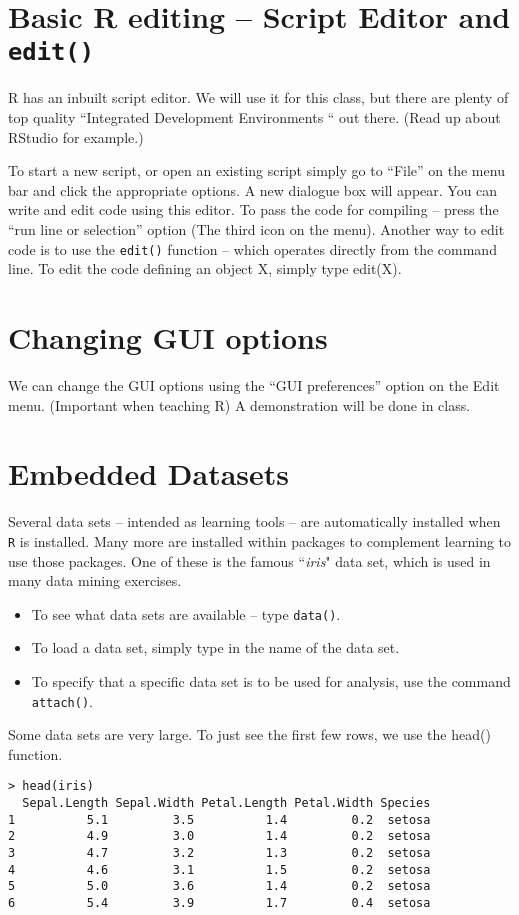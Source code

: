 

\section{Basic R editing – Script Editor and \texttt{edit()}}
R has an inbuilt script editor. We will use it for this class, but there are plenty of top quality “Integrated Development Environments “ out there. (Read up about RStudio for  example.)

To start a new script, or open an existing script simply go to “File” on the menu bar and click the appropriate options.
A new dialogue box will appear. You can write and edit code using this editor.
To pass the code for compiling – press the “run line or selection” option (The third icon on the menu).
Another way to edit code is to use the \texttt{edit()} function – which operates directly from the command line.  To edit the code defining an object X, simply type edit(X).
\section{Changing GUI options}
We can change the GUI options using the “GUI preferences” option on the Edit menu. (Important when teaching R)
A demonstration will be done in class. 
\section{Embedded Datasets}
Several data sets – intended as learning tools – are automatically installed when \texttt{R} is installed. Many more are installed within packages to complement learning to use those packages.  One of these is the famous ``\textit{iris}" data set, which is used in many data mining exercises.
\begin{itemize}
\item To see what data sets are available – type \texttt{data()}.
\item To load a data set, simply type in the name of the data set. 
\item To specify that a specific data set is to be used for analysis, use the command \texttt{attach()}.

\end{itemize}

Some data sets are very large. To just see the first few rows, we use the head() function.

\begin{framed}
\begin{verbatim}
> head(iris)
  Sepal.Length Sepal.Width Petal.Length Petal.Width Species
1          5.1         3.5          1.4         0.2  setosa
2          4.9         3.0          1.4         0.2  setosa
3          4.7         3.2          1.3         0.2  setosa
4          4.6         3.1          1.5         0.2  setosa
5          5.0         3.6          1.4         0.2  setosa
6          5.4         3.9          1.7         0.4  setosa
\end{verbatim}
\end{framed}

